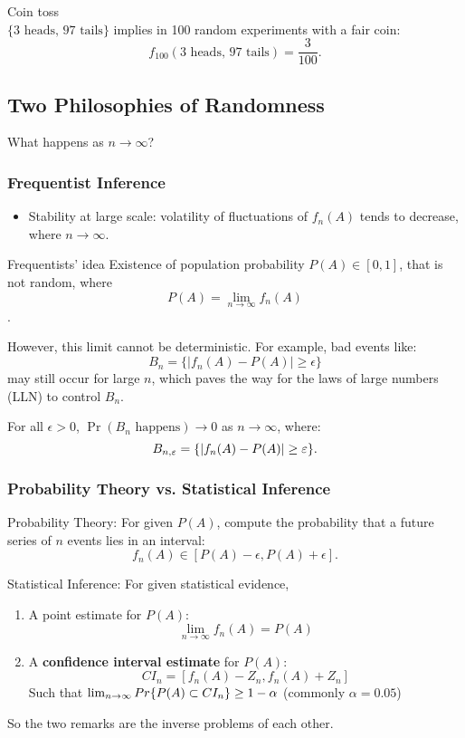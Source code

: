 \begin{eg}{Coin toss}\\
\(\{\text{3 heads, 97 tails}\}\) implies in 100 random experiments with a fair coin: 
\[
    f_{100}(\text{3 heads, 97 tails}) = \frac{3}{100}.
\]
\end{eg}


\subsection{Two Philosophies of Randomness}
\noindent What happens as \(n \to \infty\)?
\subsubsection{Frequentist Inference}
\begin{itemize}
    \item Stability at large scale: volatility of fluctuations of \(f_n(A)\) tends to decrease, where \(n \to \infty\).
\end{itemize}

\begin{thm}{Frequentists' idea}
	Existence of population probability \(P(A) \in [0, 1]\), that is not random, where 
	\[P(A) = \lim_{n \to \infty} f_n(A)\].
\end{thm}
\noindent However, this limit cannot be deterministic. For example, bad events like:
\[
B_n = \{|f_n(A) - P(A)| \geq \epsilon\}
\]
may still occur for large \(n\), which paves the way for the laws of large numbers (LLN) to control \(B_n\).


\begin{rmk}
For all \(\epsilon > 0\), \(\Pr(B_n \text{ happens}) \to 0\) as \(n \to \infty\), where:
\[
B_{n, {\varepsilon}} = \{|f_n(A) - P(A)| \geq \varepsilon\}.
\]
\end{rmk}

\subsubsection{Probability Theory vs. Statistical Inference}

\begin{rmk}{Probability Theory:} 
	For given \(P(A)\), compute the probability that a future series of \(n\) events lies in an interval:  
    \[
    f_n(A) \in [P(A) - \epsilon, P(A) + \epsilon].
    \]
\end{rmk}
\begin{rmk}{Statistical Inference:}  
For given statistical evidence, 
\begin{enumerate}
	\item A point estimate for $P(A)$: 
    	\[
   		\lim_{n\to\infty} f_n(A) = P(A)
   		\]
	\item A \textbf{confidence interval estimate} for \(P(A)\):  
    \[
   	CI_n = [f_n(A) - Z_n, f_n(A) + Z_n] 
    \]
    Such that $\lim_{n\to \infty}Pr\qty{P(A)\subset CI_n} \geq 1-\alpha$ (commonly $\alpha = 0.05$)
   
\end{enumerate}
	
\end{rmk}
So the two remarks are the inverse problems of each other. \\

